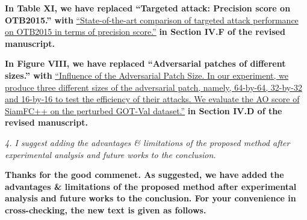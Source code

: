 \documentclass[12pt]{article}
\begin{document}
\textbf{In Table XI, we have replaced ``Targeted attack: Precision score on OTB2015.'' with}
\uline{``State-of-the-art comparison of targeted attack performance on OTB2015 in terms of precision score.''}
\textbf{in Section IV.F of the revised manuscript.}

\textbf{In Figure VIII, we have replaced ``Adversarial patches of different sizes.'' with}
\uline{``Influence of the Adversarial Patch Size. In our experiment, we produce three different sizes of the adversarial patch, namely, 64-by-64, 32-by-32 and 16-by-16 to test the efficiency of their attacks. We evaluate the AO score of SiamFC++ on the perturbed GOT-Val dataset.''}
\textbf{in Section IV.D of the revised manuscript.}

\textit{4. I suggest adding the advantages \& limitations of the proposed method after experimental analysis and future works to the conclusion.}

\textbf{Thanks for the good commenet. As suggested, we have added the advantages \& limitations of the proposed method after experimental analysis and future works to the conclusion. For your convenience in cross-checking, the new text is given as follows.}
\end{document}
